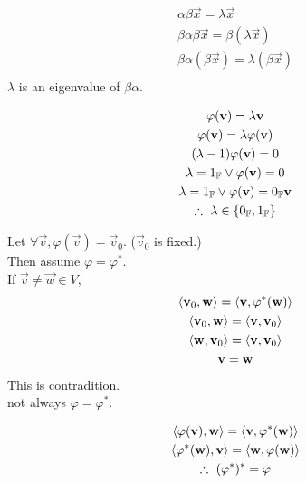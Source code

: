 \documentclass{mathtoolkit}
\begin{document}
\begin{p}
  \item
    \begin{gather*}
      \alpha \beta \vec{x} = \lambda \vec{x} \\
      \beta \alpha \beta \vec{x} = \beta (\lambda \vec{x}) \\
      \beta \alpha (\beta \vec{x}) = \lambda (\beta \vec{x}) \\
    \end{gather*}
    \therefore $\lambda$ is an eigenvalue of $\beta \alpha$.

  \item
    \begin{subp}
      \item
        \begin{gather*}
          \varphi(\vec{v}) = \lambda \vec{v} \\
          \varphi(\vec{v}) = \lambda \varphi(\vec{v}) \\
          (\lambda - 1) \varphi(\vec{v}) = 0 \\
          \lambda = 1_\field{F} \vee \varphi(\vec{v}) = 0 \\
          \lambda = 1_\field{F} \vee \varphi(\vec{v}) = 0_\field{F} \vec{v} \\
          \therefore \lambda \in \left\{ 0_\field{F}, 1_\field{F} \right\}
        \end{gather*}

      \item
        Let $\forall \vec{v}, \varphi(\vec{v}) = \vec{v}_0$.
        ($\vec{v}_0$ is fixed.) \\
        Then assume $\varphi = \varphi^*$. \\
        If $\vec{v} \ne \vec{w} \in V$,
        \begin{gather*}
          \langle \mathbf{v}_0, \mathbf{w} \rangle = \langle \mathbf{v}, \varphi^*(\mathbf{w}) \rangle \\
          \langle \mathbf{v}_0, \mathbf{w} \rangle = \langle \mathbf{v}, \mathbf{v}_0 \rangle \\
          \langle \mathbf{w}, \mathbf{v}_0 \rangle = \langle \mathbf{v}, \mathbf{v}_0 \rangle \\
          \mathbf{v} = \mathbf{w}
        \end{gather*}
        This is contradition. \\
        \therefore not always $\varphi = \varphi^*$.
    \end{subp}

  \item
    \begin{subp}
      \item
        \begin{gather*}
          \ip{\varphi(\vec{v})}{\vec{w}} = \ip{\vec{v}}{\varphi^*(\vec{w})} \\
          \ip{\varphi^*(\vec{w})}{\vec{v}} = \ip{\vec{w}}{\varphi(\vec{w})} \\
          \therefore (\varphi^*)^* = \varphi
        \end{gather*}


\end{subp}
\end{p}
\end{document}
